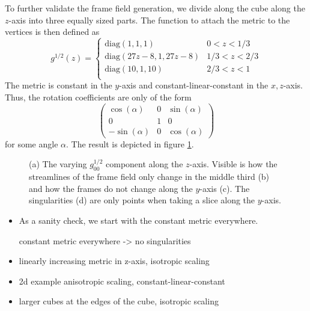 \documentclass[../thesis.tex]{subfiles}
\begin{document}
To further validate the frame field generation, we divide along the cube along
the $z$-axis into three equally sized parts.
The function to attach the metric to the vertices is then defined as
$$g^{1/2}(z) = \begin{cases}
    \mathrm{diag}(1,1,1) &0 < z < 1/3 \\
    \mathrm{diag}(27z-8,1,27z-8) &1/3 < z < 2/3 \\
    \mathrm{diag}(10,1,10) &2/3 < z < 1 \\
\end{cases}$$
The metric is constant in the $y$-axis and constant-linear-constant in the $x,z$-axis.
Thus, the rotation coefficients are only of the form
$$\begin{pmatrix}
    \cos (\alpha) & 0 & \sin(\alpha) \\
    0 & 1 & 0 \\
    -\sin(\alpha) & 0 & \cos(\alpha)
\end{pmatrix}$$
for some angle $\alpha$.
The result is depicted in figure \ref{fig:image2}.
\begin{figure}[htb]
    \centering
    \def\svgwidth{\textwidth}
    
    \caption{(a) The varying $g^{1/2}_{00}$ component along the $z$-axis. Visible is how
    the streamlines of the frame field only change in the middle third (b) and how the frames do not change along the $y$-axis (c).
    The singularities (d) are only points when taking a slice along the $y$-axis.}
    \label{fig:image2}
\end{figure}





\begin{itemize}
    \item As a sanity check, we start with the constant metric everywhere.
    
    
    
    constant metric everywhere -> no singularities
    \item linearly increasing metric in z-axis, isotropic scaling
    \item 2d example anisotropic scaling, constant-linear-constant
    \item larger cubes at the edges of the cube, isotropic scaling
\end{itemize}
\end{document}

